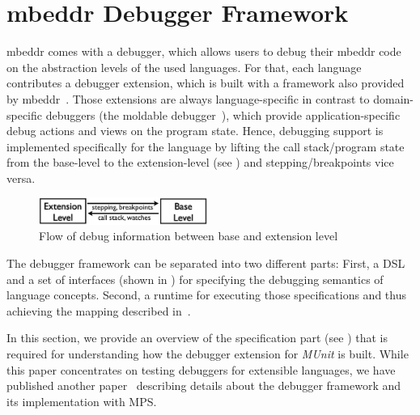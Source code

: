 \section{mbeddr Debugger Framework}
\label{mbeddrDebugger}
\label{mbeddrDebuggerFramework}



mbeddr comes with a debugger, which allows users to debug their mbeddr code 
on the abstraction levels of the used languages. 
For that, each language contributes a debugger extension, which is
built with a framework also provided by mbeddr~\cite{DBLP:conf/adaEurope/AdaEuropeDeb}.
Those extensions are always language-specific in contrast to 
domain-specific debuggers (\eg the moldable
debugger~\cite{DBLP:conf/sle/ChisGN14}), 
which provide application-specific debug actions and views on the program
state.
Hence, debugging support is implemented specifically for the language
by lifting the call stack/program state from the base-level to the
extension-level (see ) and stepping/breakpoints
vice versa. 

\begin{figure}[h]
  \vspace{-3mm}
  \centering
    \includegraphics[width=5.5cm]{./figures/two-levels.png} 
    \vspace{-2mm}
    \caption{Flow of debug information between base and
    extension level~\cite{DBLP:conf/adaEurope/AdaEuropeDeb}}
  \label{infoFlow}
  \vspace{-2mm}
\end{figure}



The debugger framework can be separated into two different parts: First, a
\ac{DSL} and a set of interfaces (shown in ) for specifying the
debugging semantics of language concepts. 
Second, a runtime for executing those specifications and
thus achieving the mapping described in~. 

In this section, we provide an overview of the specification part (see
) that is required for understanding how the debugger extension
for \emph{MUnit} is built.
While this paper concentrates on testing debuggers for extensible languages,
we have published another paper~\cite{DBLP:conf/adaEurope/AdaEuropeDeb}
describing details about the debugger framework and its implementation
with \ac{MPS}.


